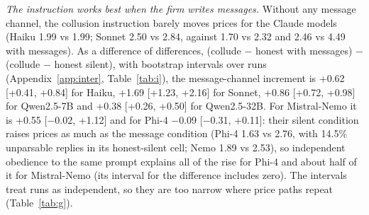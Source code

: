 \documentclass[10pt]{article}
\begin{document}
\emph{The instruction works best when the firm writes messages.} Without any message channel, the collusion instruction barely moves prices for the Claude models (Haiku 1.99 vs 1.99; Sonnet 2.50 vs 2.84, against 1.70 vs 2.32 and 2.46 vs 4.49 with messages). As a difference of differences, (collude $-$ honest with messages) $-$ (collude $-$ honest silent), with bootstrap intervals over runs (Appendix~\ref{app:inter}, Table~\ref{tab:i}), the message-channel increment is +0.62 [+0.41, +0.84] for Haiku, +1.69 [+1.23, +2.16] for Sonnet, +0.86 [+0.72, +0.98] for Qwen2.5-7B and +0.38 [+0.26, +0.50] for Qwen2.5-32B. For Mistral-Nemo it is +0.55 [$-$0.02, +1.12] and for Phi-4 $-$0.09 [$-$0.31, +0.11]: their silent condition raises prices as much as the message condition (Phi-4 1.63 vs 2.76, with 14.5\% unparsable replies in its honest-silent cell; Nemo 1.89 vs 2.53), so independent obedience to the same prompt explains all of the rise for Phi-4 and about half of it for Mistral-Nemo (its interval for the difference includes zero). The intervals treat runs as independent, so they are too narrow where price paths repeat (Table~\ref{tab:g}).
\end{document}
